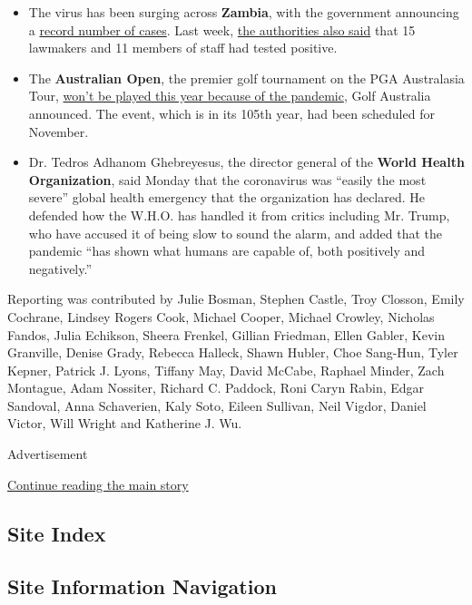 \begin{itemize}
\item
  The virus has been surging across \textbf{Zambia}, with the government
  announcing a
  \href{https://web.facebook.com/mohzambia/posts/1652250194949631?_rdc=1\&_rdr}{record
  number of cases}. Last week,
  \href{https://www.facebook.com/mohzambia/posts/1651296328378351}{the
  authorities also said} that 15 lawmakers and 11 members of staff had
  tested positive.
\item
  The \textbf{Australian Open}, the premier golf tournament on the PGA
  Australasia Tour,
  \href{https://www.golf.org.au/ausopen/australian-open-postponed-for-2020/}{won't
  be played this year because of the pandemic}, Golf Australia
  announced. The event, which is in its 105th year, had been scheduled
  for November.
\item
  Dr. Tedros Adhanom Ghebreyesus, the director general of the
  \textbf{World Health Organization}, said Monday that the coronavirus
  was ``easily the most severe'' global health emergency that the
  organization has declared. He defended how the W.H.O. has handled it
  from critics including Mr. Trump, who have accused it of being slow to
  sound the alarm, and added that the pandemic ``has shown what humans
  are capable of, both positively and negatively.''
\end{itemize}

Reporting was contributed by Julie Bosman, Stephen Castle, Troy Closson,
Emily Cochrane, Lindsey Rogers Cook, Michael Cooper, Michael Crowley,
Nicholas Fandos, Julia Echikson, Sheera Frenkel, Gillian Friedman, Ellen
Gabler, Kevin Granville, Denise Grady, Rebecca Halleck, Shawn Hubler,
Choe Sang-Hun, Tyler Kepner, Patrick J. Lyons, Tiffany May, David
McCabe, Raphael Minder, Zach Montague, Adam Nossiter, Richard C.
Paddock, Roni Caryn Rabin, Edgar Sandoval, Anna Schaverien, Kaly Soto,
Eileen Sullivan, Neil Vigdor, Daniel Victor, Will Wright and Katherine
J. Wu.

Advertisement

\protect\hyperlink{after-bottom}{Continue reading the main story}

\hypertarget{site-index}{%
\subsection{Site Index}\label{site-index}}

\hypertarget{site-information-navigation}{%
\subsection{Site Information
Navigation}\label{site-information-navigation}}

